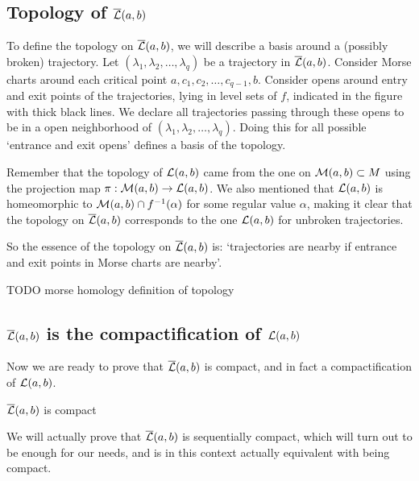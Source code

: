 \subsection{Topology of $\overline{\mathcal L}(a, b)$}

To define the topology on $\overline{\mathcal L}(a, b)$,
we will describe a basis around a (possibly broken) trajectory.
Let $(\lambda_1, \lambda_2, \ldots, \lambda_q)$ be a trajectory in $\overline{\mathcal L}(a, b)$.
Consider Morse charts around each critical point  $a, c_1, c_2, \ldots, c_{q-1}, b$.
Consider opens around entry and exit points of the trajectories, lying in level sets of $f$, indicated in the figure with thick black lines.
We declare all trajectories passing through these opens to be in a open neighborhood of $(\lambda_1, \lambda_2, \ldots, \lambda_q)$.
Doing this for all possible `entrance and exit opens' defines a basis of the topology.

Remember that the topology of  $\mathcal L(a, b)$ came from the one on $\mathcal M(a, b) \subset M$ using the projection map $\pi: \mathcal M(a, b) \to \mathcal L(a, b) $.
We also mentioned that $\mathcal L(a, b)$ is homeomorphic to $\mathcal M(a, b) \cap  f^{-1}(\alpha)$ for some regular value $\alpha$, making it clear that the topology on $\overline{\mathcal L}(a, b)$ corresponds to the one  $\mathcal L(a, b)$ for unbroken trajectories.

So the essence of the topology on $\overline{\mathcal L}(a, b)$ is: `trajectories are nearby if entrance and exit points in Morse charts are nearby'.
\begin{marginfigure}
    \centering
    \caption{TODO morse homology definition of topology}
    \label{fig:morse-homology-definition-of-topology}
\end{marginfigure}

\subsection{$\overline{\mathcal L}(a, b)$ is the compactification of $\mathcal L(a, b)$}
Now we are ready to prove that $\overline{\mathcal L}(a, b)$ is compact, and in fact a compactification of  $\mathcal L(a, b)$.
\begin{theorem}
    $\overline{\mathcal L}(a, b)$ is compact
\end{theorem}

We will actually prove that $\overline{\mathcal L}(a, b)$ is sequentially compact, which will turn out to be enough for our needs, and is in this context actually equivalent with being compact.

